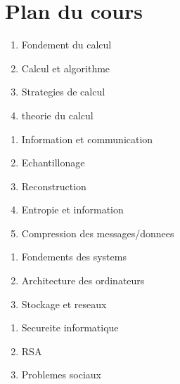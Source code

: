 \documentclass[../main.tex]{subfiles}
\begin{document}
\section{Plan du cours}
\begin{enumerate}
	\item Fondement du calcul\\
	\item Calcul et algorithme\\
	\item Strategies de calcul\\
	\item theorie du calcul
\end{enumerate}
\begin{enumerate}
	\item Information et communication\\
	\item Echantillonage\\
	\item Reconstruction\\
	\item Entropie et information\\
	\item Compression des messages/donnees
\end{enumerate}
\begin{enumerate}
	\item Fondements des systems\\
	\item Architecture des ordinateurs\\
	\item Stockage et reseaux
\end{enumerate}
\begin{enumerate}
	\item Secureite informatique\\
	\item RSA\\
	\item Problemes sociaux
\end{enumerate}
\end{document}
